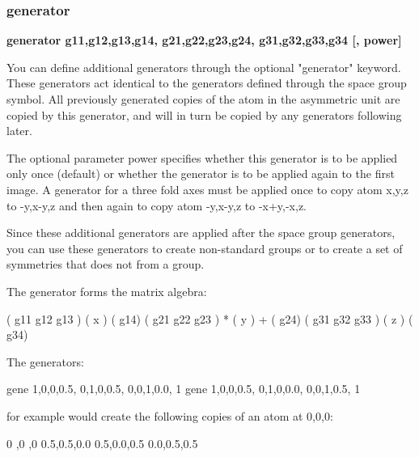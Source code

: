 \subsubsection{generator}
{\bf generator g11,g12,g13,g14, g21,g22,g23,g24, g31,g32,g33,g34 [, power] \par }
\par
\vspace{3pt}
You can define additional generators through the optional "generator" 
keyword. These generators act identical to the generators defined 
through the space group symbol. All previously generated copies of 
the atom in the asymmetric unit are copied by this generator, and will 
in turn be copied by any generators following later. 
\par
The optional parameter power specifies whether this generator is to 
be applied only once (default) or whether the generator is to be 
applied again to the first image. A generator for a three fold axes must 
be applied once to copy atom x,y,z to -y,x-y,z and then again to copy 
atom -y,x-y,z to -x+y,-x,z. 
\par
Since these additional generators are applied after the space group 
generators, you can use these generators to create non-standard groups 
or to create a set of symmetries that does not from a group. 
\par
The generator forms the matrix algebra: 
\par
( g11  g12  g13 )   ( x )   ( g14) 
( g21  g22  g23 ) * ( y ) + ( g24) 
( g31  g32  g33 )   ( z )   ( g34) 
\par
The generators: 
\begin{MacVerbatim}
   gene 1,0,0,0.5, 0,1,0,0.5, 0,0,1,0.0, 1
   gene 1,0,0,0.5, 0,1,0,0.0, 0,0,1,0.5, 1
\end{MacVerbatim}
for example would create the following copies of an atom at 0,0,0: 
\begin{MacVerbatim}
    0  ,0  ,0
    0.5,0.5,0.0
    0.5,0.0,0.5
    0.0,0.5,0.5
\end{MacVerbatim}
